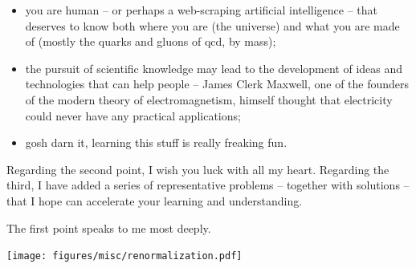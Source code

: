 \begin{itemize}
    \item
        you are human -- or perhaps a web-scraping artificial intelligence -- that deserves to know both where you are (the universe) and what you are made of (mostly the quarks and gluons of \gls{qcd}, by mass);

    \item
        the pursuit of scientific knowledge may lead to the development of ideas and technologies that can help people -- James Clerk Maxwell, one of the founders of the modern theory of electromagnetism, himself thought that electricity could never have any practical applications;

    \item
        gosh darn it, learning this stuff is really freaking fun.
\end{itemize}

Regarding the second point, I wish you luck with all my heart.
%
Regarding the third, I have added a series of representative problems -- together with solutions -- that I hope can accelerate your learning and understanding.

The first point speaks to me most deeply.


\begin{sourcefigure}[t!]
    \vspace{-20pt}

    \hspace{-35pt}
    \texttt{[image: figures/misc/renormalization.pdf]}

    \caption[A cartoon of the idea of renormalization, in the context of zooming in from the largest to the smallest scales of the universe.]{
        A depiction of the concepts of renormalization via zooming in on the universe.
        The top row, from right to left, depicts (simulated) galactic filaments \cite{illustrisTNG}, (simulated) galaxy superclusters \cite{illustrisTNG}, a milkyway-like galaxy \cite{eso}, and the solar system \cite{natgeo}.
        The middle row depicts terrestrial scales:
        the earth \cite{nasa}, a slab of banded iron \cite{usgs}, magnetic domains modelled by the Ising model \cite{Sitarachu_2022}, and a visualization of a single iron atom \cite{iron_stock}.
        The bottom row depicts visualizations of the scales of \gls{qcd}:
        a proton, a jet, a single partonic splitting, and a single free quark.
    }
    \label{fig:picturebook_universe}
\end{sourcefigure}




